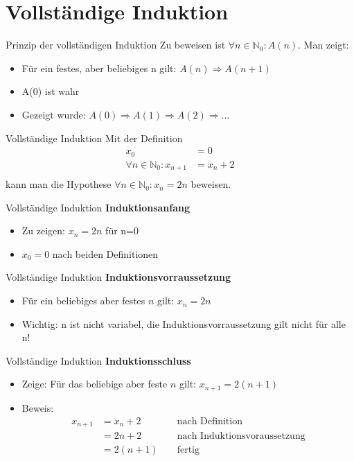 \section{Vollständige Induktion}

\begin{frame}{Prinzip der vollständigen Induktion}
  Zu beweisen ist $\forall n\in \mathbb{N}_0:A(n)$. Man zeigt:
  \begin{itemize}
    \item Für ein festes, aber beliebiges n gilt: $A(n)\Rightarrow A(n+1)$
    \item A(0) ist wahr
    \item Gezeigt wurde: $A(0)\Rightarrow A(1) \Rightarrow A(2) \Rightarrow ...$
  \end{itemize}
\end{frame}

\begin{frame}{Vollständige Induktion}
  Mit der Definition
  \begin{align*}
    x_0     &= 0 \\
    \forall n\in\mathbb{N}_0: x_{n+1} &= x_n + 2 \\
  \end{align*}
  kann man die Hypothese
  $
    \forall n\in\mathbb{N}_0:  x_n = 2n
  $
  beweisen.
\end{frame}

\begin{frame}{Vollständige Induktion}
  \textbf{Induktionsanfang}
  \begin{itemize}
    \item Zu zeigen: $x_n=2n$ für n=0
    \item $x_0=0$ nach beiden Definitionen
  \end{itemize}
\end{frame}

\begin{frame}{Vollständige Induktion}
  \textbf{Induktionsvorraussetzung}
  \begin{itemize}
    \item Für ein beliebiges aber festes $n$ gilt:  $x_n = 2n$
    \item Wichtig: n ist nicht variabel, die Induktionsvorraussetzung gilt nicht für alle n!
  \end{itemize}
\end{frame}

\begin{frame}{Vollständige Induktion}
  \textbf{Induktionsschluss}
  \begin{itemize}
    \item Zeige: Für das beliebige aber feste $n$ gilt: $x_{n+1} = 2(n+1)$
    \item Beweis:  
      \begin{align*}
        x_{n+1} &= x_n + 2 &&\text{ nach Definition}\\
        &= 2n  + 2    && \text{ nach Induktionsvoraussetzung} \\
        &= 2(n+1) && \text{ fertig}\\
      \end{align*}
  \end{itemize}
\end{frame}

